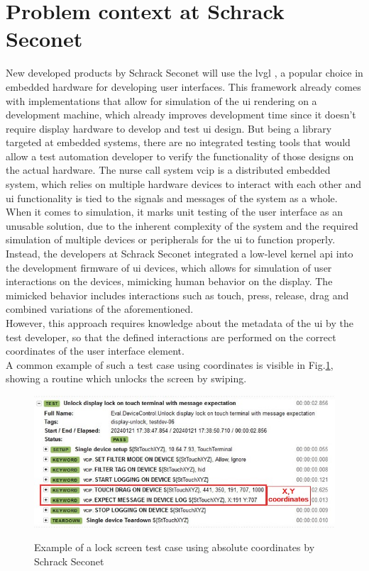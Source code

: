 \documentclass[Bachelor, BIC, english, fhCitStyle, IEEE]{BASE/twbook} %
\begin{document}
\section{Problem context at Schrack Seconet}
New developed products by Schrack Seconet will use the \acf{lvgl} \autocite{LVGLLightVersatile}, a popular choice in embedded hardware for developing user interfaces. This framework already comes with implementations that allow for simulation of the \ac{ui} rendering on a development machine, which already improves development time since it doesn't require display hardware to develop and test \ac{ui} design.
But being a library targeted at embedded systems, there are no integrated testing tools that would allow a test automation developer to verify the functionality of those designs on the actual hardware. The nurse call system \ac{vcip} \autocite{VisocallIPModerne} is a distributed embedded system, which relies on multiple hardware devices to interact with each other and \ac{ui} functionality is tied to the signals and messages of the system as a whole.
When it comes to simulation, it marks unit testing of the user interface as an unusable solution, due to the inherent complexity of the system and the required simulation of multiple devices or peripherals for the \ac{ui} to function properly.\\
Instead, the developers at Schrack Seconet integrated a low-level kernel \ac{api} into the development firmware of \ac{ui} devices, which allows for simulation of user interactions on the devices, mimicking human behavior on the display. The mimicked behavior includes interactions such as touch, press, release, drag and combined variations of the aforementioned.\\
However, this approach requires knowledge about the metadata of the \ac{ui} by the test developer, so that the defined interactions are performed on the correct coordinates of the user interface element.\\
A common example of such a test case using coordinates is visible in Fig.\ref{fig:lock-screen-test-example}, showing a routine which unlocks the screen by swiping.
\begin{figure}
    \caption{Example of a lock screen test case using absolute coordinates by Schrack Seconet}
    \centering
    \includegraphics[width=\textwidth]{lock-screen-testcase.jpg}
    \label{fig:lock-screen-test-example}
\end{figure}\\
\end{document}
